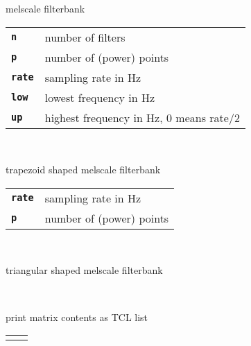 \begin{description}
\begin{description}
        melscale filterbank

      \begin{tabular}{ll}
 \texttt{\textbf{n}} &     number of filters  \\
 \texttt{\textbf{p}} &     number of (power) points  \\
 \texttt{\textbf{rate}} &  sampling rate in Hz  \\
 \texttt{\textbf{low}} &   lowest frequency in Hz  \\
 \texttt{\textbf{up}} &    highest frequency in Hz, 0 means rate/2  \\
      \end{tabular}
       \texttt{  } \

        trapezoid shaped melscale filterbank

      \begin{tabular}{ll}
 \texttt{\textbf{rate}} &  sampling rate in Hz  \\
 \texttt{\textbf{p}} &     number of (power) points  \\
      \end{tabular}
       \texttt{} \

        triangular shaped melscale filterbank

       \texttt{ } \

        print matrix contents as TCL list

      \begin{tabular}{ll}
 \texttt{\textbf{}} &  \\
      \end{tabular}
    \end{description}

\end{description}

